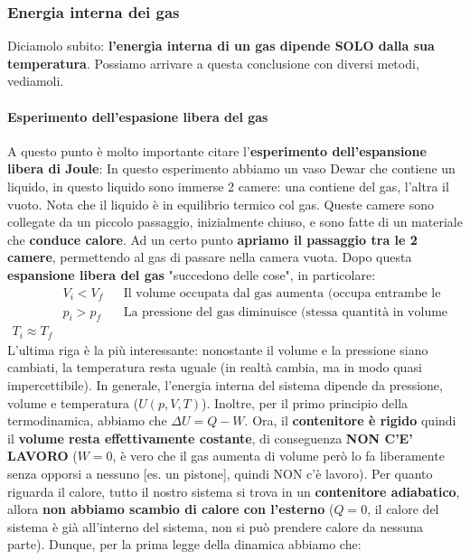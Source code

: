             \subsubsection{Energia interna dei gas}
                Diciamolo subito: \textbf{l'energia interna di un gas dipende SOLO dalla sua temperatura}. Possiamo arrivare a questa conclusione con diversi metodi, vediamoli.
                \paragraph{Esperimento dell'espasione libera del gas}
                    A questo punto è molto importante citare l'\textbf{esperimento dell'espansione libera di Joule}:
                    In questo esperimento abbiamo un vaso Dewar che contiene un liquido, in questo liquido sono immerse 2 camere: una contiene del gas, l'altra il vuoto. Nota che il liquido è in equilibrio termico col gas. Queste camere sono collegate da un piccolo passaggio, inizialmente chiuso, e sono fatte di un materiale che \textbf{conduce calore}. Ad un certo punto \textbf{apriamo il passaggio tra le 2 camere}, permettendo al gas di passare nella camera vuota. Dopo questa \textbf{espansione libera del gas} "succedono delle cose", in particolare:
                    \begin{align*}
                        & V_i < V_f && \textrm{Il volume occupata dal gas aumenta (occupa entrambe le camere)}\\
                        & p_i > p_f && \textrm{La pressione del gas diminuisce (stessa quantità in volume maggiore)}\\
                        T_i \approx T_f
                    \end{align*}
                    L'ultima riga è la più interessante: nonostante il volume e la pressione siano cambiati, la temperatura resta uguale (in realtà cambia, ma in modo quasi impercettibile). In generale, l'energia interna del sistema dipende da pressione, volume e temperatura ($U(p, V, T)$). Inoltre, per il primo principio della termodinamica, abbiamo che $\Delta U = Q - W$. Ora, il \textbf{contenitore è rigido}  quindi il \textbf{volume resta effettivamente costante}, di conseguenza \textbf{NON C'E' LAVORO} ($W=0$, è vero che il gas aumenta di volume però lo fa liberamente senza opporsi a nessuno [es. un pistone], quindi NON c'è lavoro). Per quanto riguarda il calore, tutto il nostro sistema si trova in un \textbf{contenitore adiabatico}, allora \textbf{non abbiamo scambio di calore con l'esterno} ($Q=0$, il calore del sistema è già all'interno del sistema, non si può prendere calore da nessuna parte). Dunque, per la prima legge della dinamica abbiamo che:
